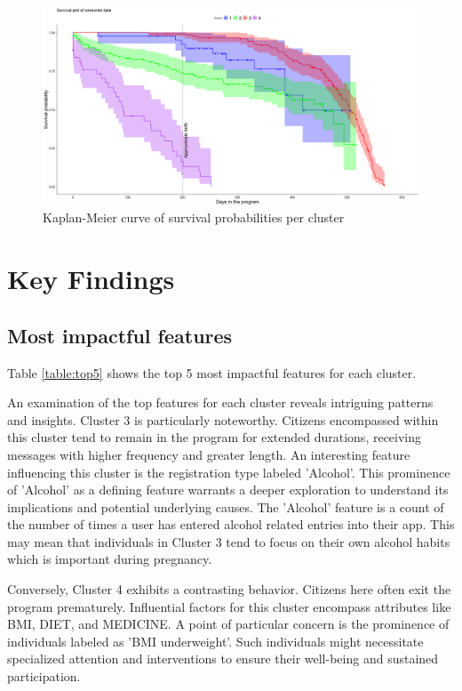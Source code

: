 \documentclass[12pt]{article}
\begin{document}
	\begin{figure}[h]
		\begin{center}
			\includegraphics[width=150mm]{images/censored, birth.png}
			\caption{Kaplan-Meier curve of survival probabilities per cluster}
			\label{fig:cens_surv}
		\end{center}
	\end{figure}

\newpage

\section{Key Findings}

\label{s.key}

\subsection{Most impactful features}

Table \ref{table:top5} shows the top 5 most impactful features for each cluster.

An examination of the top features for each cluster reveals intriguing patterns and insights. Cluster 3 is particularly noteworthy. Citizens encompassed within this cluster tend to remain in the program for extended durations, receiving messages with higher frequency and greater length. An interesting feature influencing this cluster is the registration type labeled 'Alcohol'. This prominence of 'Alcohol' as a defining feature warrants a deeper exploration to understand its implications and potential underlying causes. The 'Alcohol' feature is a count of the number of times a user has entered alcohol related entries into their app. This may mean that individuals in Cluster 3 tend to focus on their own alcohol habits which is important during pregnancy.

Conversely, Cluster 4 exhibits a contrasting behavior. Citizens here often exit the program prematurely. Influential factors for this cluster encompass attributes like BMI, DIET, and MEDICINE. A point of particular concern is the prominence of individuals labeled as 'BMI underweight'. Such individuals might necessitate specialized attention and interventions to ensure their well-being and sustained participation.
\end{document}
